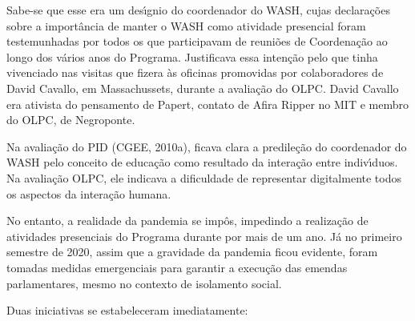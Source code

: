 \documentclass[
12pt,		%
openright,	%
twoside,  %
a4paper,			%
chapter=TITLE,		%
english,			%
french,				%
spanish,			%
brazil				%
]{USPSC-classe/USPSC}
\begin{document}
Sabe-se que esse era um des\'{\i}gnio do coordenador do WASH, cujas declara\c{c}\~oes sobre a import\^ancia de manter o WASH como atividade presencial foram testemunhadas por todos os que participavam de reuni\~oes de Coordena\c{c}\~ao ao longo dos v\'arios anos do Programa. Justificava essa inten\c{c}\~ao pelo que tinha vivenciado nas visitas que fizera \`as oficinas promovidas por colaboradores de David Cavallo, em Massachussets, durante a avalia\c{c}\~ao do OLPC. David Cavallo era ativista do pensamento de Papert, contato de Afira Ripper no MIT e membro do OLPC, de Negroponte.

















Na avalia\c{c}\~ao do PID  (CGEE, 2010a), ficava clara a predile\c{c}\~ao do coordenador do WASH pelo conceito de educa\c{c}\~ao como resultado da intera\c{c}\~ao entre indiv\'{\i}duos. Na avalia\c{c}\~ao OLPC, ele indicava a dificuldade de representar digitalmente todos os aspectos da intera\c{c}\~ao humana.

















No entanto, a realidade da pandemia se imp\^os, impedindo a realiza\c{c}\~ao de atividades presenciais do Programa durante por mais de um ano. J\'a no primeiro semestre de 2020, assim que a gravidade da pandemia ficou evidente, foram tomadas medidas emergenciais para garantir a execu\c{c}\~ao das emendas parlamentares, mesmo no contexto de isolamento social.

















Duas iniciativas se estabeleceram imediatamente:
\end{document}
